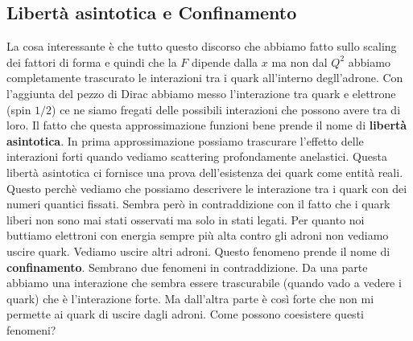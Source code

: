\subsection{Libertà asintotica e Confinamento}
La cosa interessante è che tutto questo discorso che abbiamo fatto sullo scaling dei fattori di forma e quindi che la $F$ dipende dalla $x$ ma non dal $Q^2$ abbiamo completamente trascurato le interazioni tra i quark all'interno degll'adrone. Con l'aggiunta del pezzo di Dirac abbiamo messo l'interazione tra quark e elettrone (spin $1/2$) ce ne siamo fregati delle possibili interazioni che possono avere tra di loro. Il fatto che questa approssimazione funzioni bene prende il nome di \textbf{libertà asintotica}. In prima approssimazione possiamo trascurare l'effetto delle interazioni forti quando vediamo scattering profondamente anelastici. Questa libertà asintotica ci fornisce una prova dell'esistenza dei quark come entità reali. Questo perchè vediamo che possiamo descrivere le interazione tra i quark con dei numeri quantici fissati. Sembra però in contraddizione con il fatto che i quark liberi non sono mai stati osservati ma solo in stati legati. Per quanto noi buttiamo elettroni con energia sempre più alta contro gli adroni non vediamo uscire quark. Vediamo uscire altri adroni. Questo fenomeno prende il nome di \textbf{confinamento}. Sembrano due fenomeni in contraddizione. Da una parte abbiamo una interazione che sembra essere trascurabile (quando vado a vedere i quark) che è l'interazione forte. Ma dall'altra parte è così forte che non mi permette ai quark di uscire dagli adroni. Come possono coesistere questi fenomeni?

